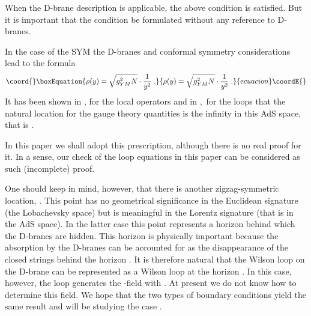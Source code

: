 \documentclass[a4paper,12pt]{article}
\numberwithin{equation}{section}
\begin{document}
When the D-brane description is applicable, the above condition is satisfied.
But it is important that the condition be formulated without any reference to
D-branes. 

In the case of the \coordHE{} SYM the D-branes and conformal symmetry
considerations lead to the formula \cite{3}
\begin{equation}\coord{}\boxEquation{
\label{3.7}
\rho (y)=\sqrt{{g_{YM}^{2}N}}\cdot \frac{1}{y^{2}}\; .
}{
\rho (y)=\sqrt{{g_{YM}^{2}N}}\cdot \frac{1}{y^{2}}\; .
}{ecuacion}\coordE{}\end{equation}
 It has been shown in \cite{4}, \cite{5} for the local operators and in \cite{13},\,\cite{14}
for the loops that the natural location for the gauge theory quantities is the
infinity in this AdS space, that is \coordHE{}. 

In this paper we shall adopt this prescription, although there is no real proof
for it. In a sense, our check of the loop equations in this paper can be considered
as such (incomplete) proof.

One should keep in mind, however, that there is another zigzag-symmetric location,
\coordHE{}. This point has no geometrical significance in the Euclidean
signature (the Lobachevsky space) but is meaningful in the Lorentz signature
(that is in the AdS space). In the latter case this point represents a horizon
behind which the D-branes are hidden. This horizon is physically important because
the absorption by the D-branes can be accounted for as the disappearance of
the closed strings behind the horizon \cite{2}. It is therefore natural that
the Wilson loop \coordHE{} on the D-brane can be represented as a Wilson loop
at the horizon \cite{1}. In this case, however, the loop generates the \coordHE{}-field
with \coordHE{} \cite{1}. At present we do not
know how to determine this field. We hope that the two types of boundary conditions
yield the same result and will be studying the case \coordHE{}.
\end{document}
